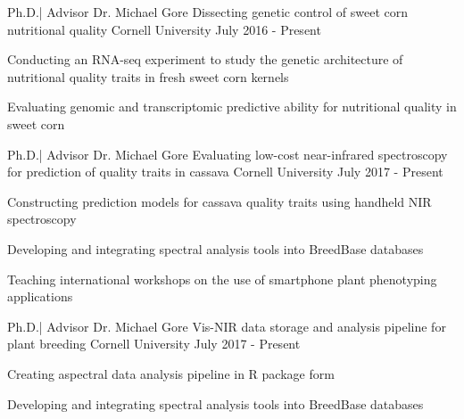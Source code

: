 
\begin{cventries}


  \cventry
    {Ph.D.| Advisor Dr. Michael Gore} %
    {Dissecting genetic control of sweet corn nutritional quality} %
    {Cornell University} %
    {July 2016 - Present} %
    {
      \begin{cvitems} %
        \item {Conducting an RNA-seq experiment to study the genetic architecture of nutritional quality traits in fresh sweet corn kernels}
        \item {Evaluating genomic and transcriptomic predictive ability for nutritional quality in sweet corn}
      \end{cvitems}
    }

  \cventry
    {Ph.D.| Advisor Dr. Michael Gore} %
    {Evaluating low-cost near-infrared spectroscopy for prediction of quality traits in cassava} %
    {Cornell University} %
    {July 2017 - Present} %
    {
      \begin{cvitems} %
        \item {Constructing prediction models for cassava quality traits using handheld NIR spectroscopy}
        \item {Developing and integrating spectral analysis tools into BreedBase databases}
        \item {Teaching international workshops on the use of smartphone plant phenotyping applications}
      \end{cvitems}
    }

  \cventry
    {Ph.D.| Advisor Dr. Michael Gore} %
    {Vis-NIR data storage and analysis pipeline for plant breeding} %
    {Cornell University} %
    {July 2017 - Present} %
    {
      \begin{cvitems} %
        \item {Creating aspectral data analysis pipeline in R package form}
        \item {Developing and integrating spectral analysis tools into BreedBase databases}
      \end{cvitems}
    }


\end{cventries}
